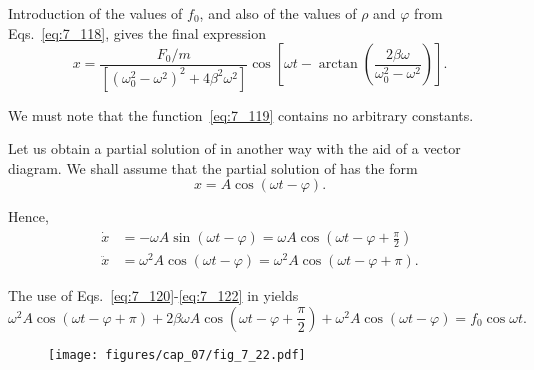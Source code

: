 \noindent
Introduction of the values of $f_0$, and also of the values of $\rho$ and $\varphi$ from Eqs.~\eqref{eq:7_118}, gives the final expression
\begin{equation}\label{eq:7_119}
	x = \frac{F_0/m}{\left[\left(\omega_0^2 - \omega^2\right)^2 + 4\beta^2\omega^2\right]}\cos\left[\omega t - \arctan\left(\frac{2\beta\omega}{\omega_0^2 - \omega^2}\right)\right].
\end{equation}

\noindent
We must note that the function~\eqref{eq:7_119} contains no arbitrary constants.

Let us obtain a partial solution of  in another way with the aid of a vector diagram. We shall assume that the partial solution of  has the form
\vspace{-12pt}
\begin{equation}\label{eq:7_120}
	x = A\cos(\omega t - \varphi).
\end{equation}

\noindent
Hence,
\begin{align}
	\dot{x} &= -\omega A\sin(\omega t - \varphi) = \omega A\cos\left(\omega t - \varphi + \frac{\pi}{2}\right)\label{eq:7_121}\\
	\ddot{x} &= \omega^2 A\cos(\omega t - \varphi) = \omega^2 A\cos(\omega t - \varphi + \pi)\label{eq:7_122}.
\end{align}

\noindent
The use of Eqs.~\eqref{eq:7_120}-\eqref{eq:7_122} in  yields
\begin{equation}\label{eq:7_123}
	\omega^2 A\cos(\omega t - \varphi + \pi) + 2\beta\omega A \cos\left(\omega t - \varphi + \frac{\pi}{2}\right) + 
	\omega^2 A\cos(\omega t - \varphi) = f_0\cos\omega t.
\end{equation}

\begin{figure}[t]
	\begin{center}
		\texttt{[image: figures/cap\_07/fig\_7\_22.pdf]}
		\caption[]{}
		\label{fig:7_22}
	\end{center}
	\vspace{-0.8cm}
\end{figure}

